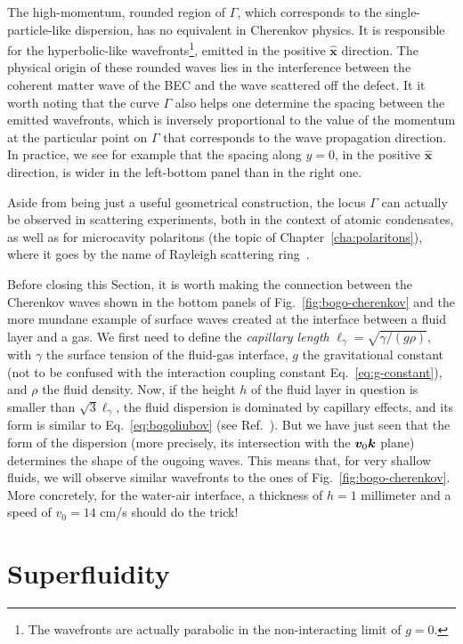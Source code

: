 The high-momentum, rounded region of $\Gamma$, which corresponds to
the single-particle-like dispersion, has no equivalent in Cherenkov
physics. It is responsible for the hyperbolic-like
wavefronts\footnote{The wavefronts are actually parabolic in the
  non-interacting limit of $g=0$.}, emitted in the positive
$\hat{\bm{x}}$ direction. The physical origin of these rounded waves
lies in the interference between the coherent matter wave of the BEC
and the wave scattered off the defect. It it worth noting that the
curve $\Gamma$ also helps one determine the spacing between the
emitted wavefronts, which is inversely proportional to the value of
the momentum at the particular point on $\Gamma$ that corresponds to
the wave propagation direction. In practice, we see for example that
the spacing along $y = 0$, in the positive $\hat{\bm{x}}$ direction,
is wider in the left-bottom panel than in the right one.

Aside from being just a useful geometrical construction, the locus
$\Gamma$ can actually be observed in scattering experiments, both in
the context of atomic condensates, as well as for microcavity
polaritons (the topic of Chapter~\ref{cha:polaritons}), where it goes
by the name of Rayleigh scattering ring~\cite{Ciuti_2005}.

Before closing this Section, it is worth making the connection between
the Cherenkov waves shown in the bottom panels of
Fig.~\ref{fig:bogo-cherenkov} and the more mundane example of surface
waves created at the interface between a fluid layer and a gas. We
first need to define the \textit{capillary length}
$\ell_{\gamma} = \sqrt{\gamma/(g\rho)}$, with $\gamma$ the surface
tension of the fluid-gas interface, $g$ the gravitational constant
(not to be confused with the interaction coupling constant
Eq.~\eqref{eq:g-constant}), and $\rho$ the fluid density. Now, if the
height $h$ of the fluid layer in question is smaller than
$\sqrt{3} \ell_{\gamma}$, the fluid dispersion is dominated by
capillary effects, and its form is similar to
Eq.~\eqref{eq:bogoliubov} (see Ref.~\cite{9783319002651}). But we have
just seen that the form of the dispersion (more precisely, its
intersection with the $\bm{v}_0\bm{k}$ plane) determines the shape of the
ougoing waves. This means that, for very shallow fluids, we will
observe similar wavefronts to the ones of
Fig.~\ref{fig:bogo-cherenkov}. More concretely, for the water-air
interface, a thickness of $h = 1$ millimeter and a speed of
$v_0 = 14$ cm/s should do the trick!

\section{Superfluidity}
\label{sec:superfluid-atom}

